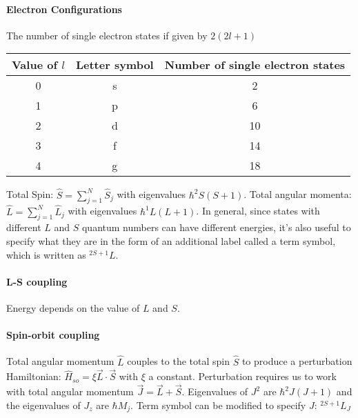 \paragraph{Electron Configurations}
The number of single electron states if given by $2(2l+1)$

\begin{tabular}{|c|c|c|}
    \hline
    Value of $l$ & Letter symbol & Number of single electron states \\
    \hline
    0 & s & 2 \\ \hline
    1 & p & 6 \\ \hline
    2 & d & 10 \\ \hline
    3 & f & 14 \\ \hline
    4 & g & 18 \\ \hline
\end{tabular}

Total Spin: $\hat{S} = \sum_{j=1}^N \hat{S}_j$ with eigenvalues $\hbar^2 S(S+1)$.
Total angular momenta: $\hat{L} = \sum_{j=1}^N \hat{L}_j$ with eigenvalues
$\hbar^1 L(L+1)$. In general, since states with different $L$ and $S$ quantum numbers
can have different energies, it's also useful to specify what they are in the form
of an additional label called a term symbol, which is written as $^{2S+1}L$.

\paragraph{L-S coupling}
Energy depends on the value of $L$ and $S$.

\paragraph{Spin-orbit coupling}
Total angular momentum $\hat{L}$ couples to the total spin $\hat{S}$ to produce
a perturbation Hamiltonian: $\hat{H}_{so} = \xi \vec{L} \cdot \vec{S}$ with $\xi$
a constant. Perturbation requires us to work with total angular momentum
$\vec{J} = \vec{L} + \vec{S}$. Eigenvalues of $J^2$ are $\hbar^2 J(J+1)$ and the
eigenvalues of $J_z$ are $\hbar M_j$. Term symbol can be modified to specify
$J$: $^{2S+1}L_J$






